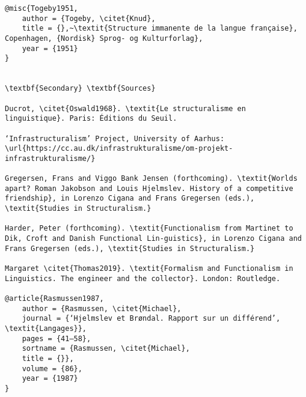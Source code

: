 \begin{verbatim}
@misc{Togeby1951,
	author = {Togeby, \citet{Knud},
	title = {},~\textit{Structure immanente de la langue française}, Copenhagen, {Nordisk} Sprog- og Kulturforlag},
	year = {1951}
}


\textbf{Secondary} \textbf{Sources}

Ducrot, \citet{Oswald1968}. \textit{Le structuralisme en linguistique}. Paris: Éditions du Seuil.

‘Infrastructuralism’ Project, University of Aarhus: \url{https://cc.au.dk/infrastrukturalisme/om-projekt-infrastrukturalisme/}

Gregersen, Frans and Viggo Bank Jensen (forthcoming). \textit{Worlds apart? Roman Jakobson and Louis Hjelmslev. History of a competitive friendship}, in Lorenzo Cigana and Frans Gregersen (eds.), \textit{Studies in Structuralism.}

Harder, Peter (forthcoming). \textit{Functionalism from Martinet to Dik, Croft and Danish Functional Lin-guistics}, in Lorenzo Cigana and Frans Gregersen (eds.), \textit{Studies in Structuralism.}

Margaret \citet{Thomas2019}. \textit{Formalism and Functionalism in Linguistics. The engineer and the collector}. London: Routledge.

@article{Rasmussen1987,
	author = {Rasmussen, \citet{Michael},
	journal = {‘Hjelmslev et Brøndal. Rapport sur un différend’, \textit{Langages}},
	pages = {41–58},
	sortname = {Rasmussen, \citet{Michael},
	title = {}},
	volume = {86},
	year = {1987}
}


\end{verbatim}